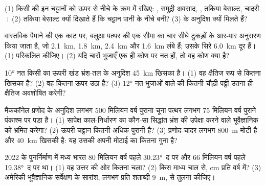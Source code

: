 \begin{exercise}[$\star$]\label{exo:g12:mountain-building:5}
(1) किसी  की इन चट्टानों को ऊपर से नीचे के क्रम में रखिए: ,
समुद्री अवसाद, , तकिया बेसाल्ट, चादरी । (2) तकिया बेसाल्ट
क्यों दिखाते हैं कि चट्टान पानी के नीचे बनी? (3) 
 के अनुदिश क्यों मिलते हैं?
\end{exercise}

\begin{exercise}[$\star\star$]\label{exo:g12:mountain-building:6}
वास्तविक पैमाने की एक काट पर, बलुआ पत्थर की एक सीमा का चार
सीधे टुकड़ों के आर-पार अनुसरण किया जाता है, जो \qty{2.1}{km}, \qty{1.8}{km}, \qty{2.4}{km} और
\qty{1.6}{km} लंबे हैं; उसके सिरे \qty{6.0}{km} दूर हैं। (1)
 परिकलित कीजिए। (2) यदि चारों भुजाएँ एक ही कोण पर नत हों, तो वह कोण क्या है?
\end{exercise}

\begin{exercise}[$\star\star$]\label{exo:g12:mountain-building:7}
\ang{10} नत किसी  का ऊपरी खंड भ्रंश-तल के अनुदिश \qty{45}{km}
खिसका है। (1) वह क्षैतिज रूप से कितना खिसका है? (2) वह कितना
ऊपर उठा है? (3) \ang{12} नत भुजाओं वाले  की कितनी चौड़ी पट्टी
उतना ही क्षैतिज  अवशोषित करेगी?
\end{exercise}

\begin{exercise}[$\star\star$]\label{exo:g12:mountain-building:8}
मैककॉनेल प्रणोद के अनुदिश लगभग 500 मिलियन वर्ष पुराना चूना पत्थर
लगभग 75 मिलियन वर्ष पुराने पंकाश्म पर पड़ा है। (1) सापेक्ष काल-निर्धारण का कौन-सा सिद्धांत
भ्रंश की उपेक्षा करने वाले भूवैज्ञानिक को भ्रमित करेगा? (2) ऊपरी चट्टान कितनी
अधिक पुरानी है? (3) प्रणोद-चादर लगभग \qty{800}{m} मोटी है और
\qty{40}{km} खिसकी है: यह उसकी अपनी मोटाई का कितना गुना है?
\end{exercise}

\begin{exercise}[$\star\star$]\label{exo:g12:mountain-building:9}
2022 के पुनर्निर्माण में मध्य भारत 80 मिलियन
वर्ष पहले \ang{30.23}~द पर और 66 मिलियन वर्ष पहले \ang{19.38}~द पर था। (1) वह उत्तर की ओर कितना
चला? (2) किस माध्य चाल से, \unit{cm} प्रति वर्ष में? (3) अमेरिकी भूवैज्ञानिक सर्वेक्षण के
सारांश, लगभग प्रति शताब्दी \qty{9}{m}, से तुलना कीजिए।
\end{exercise}

